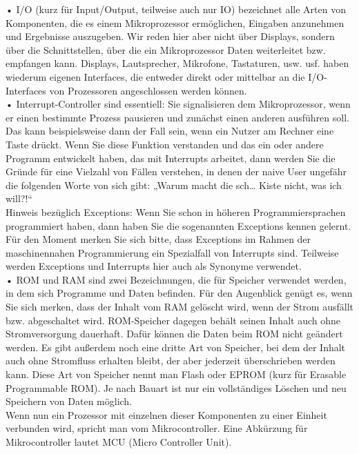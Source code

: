 •	I/O (kurz für Input/Output, teilweise auch nur IO) bezeichnet alle Arten von Komponenten, die es einem Mikroprozessor ermöglichen, Eingaben anzunehmen und Ergebnisse auszugeben. Wir reden hier aber nicht über Displays, sondern über die Schnittstellen, über die ein Mikroprozessor Daten weiterleitet bzw. empfangen kann. Displays, Lautsprecher, Mikrofone, Tastaturen, usw. usf. haben wiederum eigenen Interfaces, die entweder direkt oder mittelbar an die I/O-Interfaces von Prozessoren angeschlossen werden können.\\

•	Interrupt-Controller sind essentiell: Sie signalisieren dem Mikroprozessor, wenn er einen bestimmte Prozess pausieren und zunächst einen anderen ausführen soll. Das kann beispielsweise dann der Fall sein, wenn ein Nutzer am Rechner eine Taste drückt. Wenn Sie diese Funktion verstanden und das ein oder andere Programm entwickelt haben, das mit Interrupts arbeitet, dann werden Sie die Gründe für eine Vielzahl von Fällen verstehen, in denen der naive User ungefähr die folgenden Worte von sich gibt: „Warum macht die sch… Kiste nicht, was ich will?!“\\

Hinweis bezüglich Exceptions: Wenn Sie schon in höheren Programmiersprachen programmiert haben, dann haben Sie die sogenannten Exceptions kennen gelernt. Für den Moment merken Sie sich bitte, dass Exceptions im Rahmen der maschinennahen Programmierung ein Spezialfall von Interrupts sind. Teilweise werden Exceptions und Interrupts hier auch als Synonyme verwendet.\\

•	ROM und RAM sind zwei Bezeichnungen, die für Speicher verwendet werden, in dem sich Programme und Daten befinden. Für den Augenblick genügt es, wenn Sie sich merken, dass der Inhalt vom RAM gelöscht wird, wenn der Strom ausfällt bzw. abgeschaltet wird. ROM-Speicher dagegen behält seinen Inhalt auch ohne Stromversorgung dauerhaft. Dafür können die Daten beim ROM nicht geändert werden. Es gibt außerdem noch eine dritte Art von Speicher, bei dem der Inhalt auch ohne Stromfluss erhalten bleibt, der aber jederzeit überschrieben werden kann. Diese Art von Speicher nennt man Flash oder EPROM (kurz für Erasable Programmable ROM). Je nach Bauart ist nur ein vollständiges Löschen und neu Speichern von Daten möglich.\\

Wenn nun ein Prozessor mit einzelnen dieser Komponenten zu einer Einheit verbunden wird, spricht man vom Mikrocontroller. Eine Abkürzung für Mikrocontroller lautet MCU (Micro Controller Unit).\\

